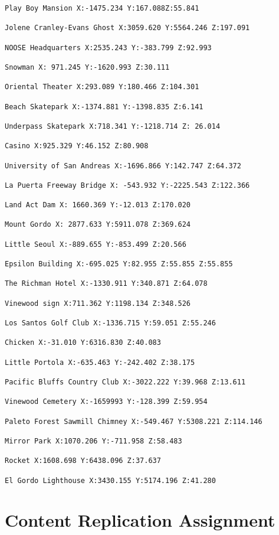 \documentclass[
  openany]{book}
\begin{document}
\begin{verbatim}
Play Boy Mansion X:-1475.234 Y:167.088Z:55.841

Jolene Cranley-Evans Ghost X:3059.620 Y:5564.246 Z:197.091

NOOSE Headquarters X:2535.243 Y:-383.799 Z:92.993

Snowman X: 971.245 Y:-1620.993 Z:30.111

Oriental Theater X:293.089 Y:180.466 Z:104.301

Beach Skatepark X:-1374.881 Y:-1398.835 Z:6.141

Underpass Skatepark X:718.341 Y:-1218.714 Z: 26.014

Casino X:925.329 Y:46.152 Z:80.908

University of San Andreas X:-1696.866 Y:142.747 Z:64.372

La Puerta Freeway Bridge X: -543.932 Y:-2225.543 Z:122.366

Land Act Dam X: 1660.369 Y:-12.013 Z:170.020

Mount Gordo X: 2877.633 Y:5911.078 Z:369.624

Little Seoul X:-889.655 Y:-853.499 Z:20.566

Epsilon Building X:-695.025 Y:82.955 Z:55.855 Z:55.855

The Richman Hotel X:-1330.911 Y:340.871 Z:64.078

Vinewood sign X:711.362 Y:1198.134 Z:348.526

Los Santos Golf Club X:-1336.715 Y:59.051 Z:55.246

Chicken X:-31.010 Y:6316.830 Z:40.083

Little Portola X:-635.463 Y:-242.402 Z:38.175

Pacific Bluffs Country Club X:-3022.222 Y:39.968 Z:13.611

Vinewood Cemetery X:-1659993 Y:-128.399 Z:59.954

Paleto Forest Sawmill Chimney X:-549.467 Y:5308.221 Z:114.146

Mirror Park X:1070.206 Y:-711.958 Z:58.483

Rocket X:1608.698 Y:6438.096 Z:37.637

El Gordo Lighthouse X:3430.155 Y:5174.196 Z:41.280
\end{verbatim}

\hypertarget{content-replication-assignment-4}{%
\section*{Content Replication Assignment}\label{content-replication-assignment-4}}
\end{document}
